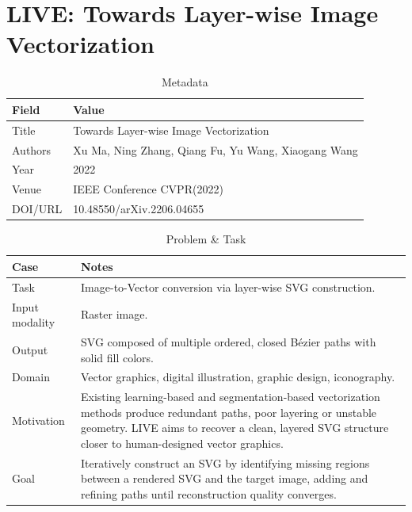 \newpage
\chapter{LIVE: Towards Layer-wise Image Vectorization}

\begin{table}[h!]
\centering
\caption{Metadata}
\begin{tabular}{|l|l|}
\hline
\textbf{Field} & \textbf{Value} \\ \hline
Title & Towards Layer-wise Image Vectorization \\ \hline
Authors & Xu Ma, Ning Zhang, Qiang Fu, Yu Wang, Xiaogang Wang \\ \hline
Year & 2022 \\ \hline
Venue & IEEE Conference CVPR(2022) \\ \hline
DOI/URL & 10.48550/arXiv.2206.04655 \\ \hline
\end{tabular}
\end{table}

\begin{table}[h!]
\centering
\caption{Problem \& Task}
\begin{tabular}{|l|p{10cm}|}
\hline
\textbf{Case} & \textbf{Notes} \\ \hline
Task &
Image-to-Vector conversion via layer-wise SVG construction. \\ \hline
Input modality &
Raster image. \\ \hline
Output &
SVG composed of multiple ordered, closed Bézier paths with solid fill colors. \\ \hline
Domain &
Vector graphics, digital illustration, graphic design, iconography. \\ \hline
Motivation &
Existing learning-based and segmentation-based vectorization methods produce redundant paths, poor layering or unstable geometry. LIVE aims to recover a clean, layered SVG structure closer to human-designed vector graphics. \\ \hline
Goal &
Iteratively construct an SVG by identifying missing regions between a rendered SVG and the target image, adding and refining paths until reconstruction quality converges. \\ \hline
\end{tabular}
\end{table}

